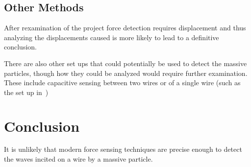 \documentclass{report}
\begin{document}
\section*{Other Methods}
After rexamination of the project force detection requires displacement and thus analyzing the displacements caused is more likely to lead to a definitive conclusion.

There are also other set ups that could potentially be used to detect the massive particles, though how they could be analyzed would require further examination. 
These include capacitive sensing between two wires or of a single wire (such as the set up in~\cite{Moser2013})
\chapter*{Conclusion}
It is unlikely that modern force sensing techniques are precise enough to detect the waves incited on a wire by a massive particle. 
\printbibliography[]
\end{document}
